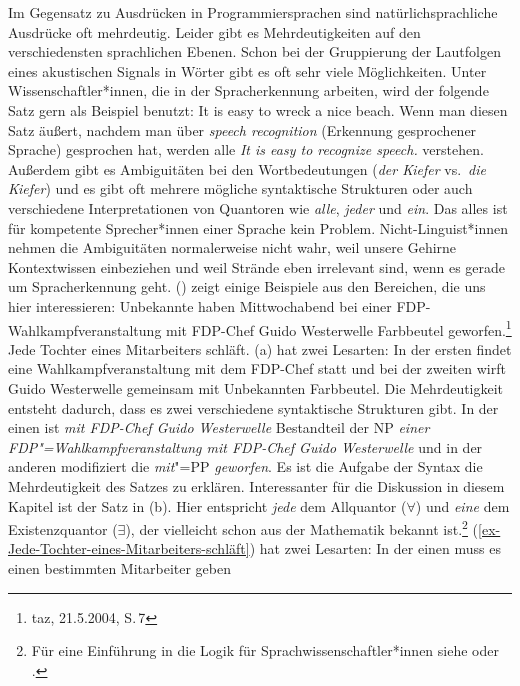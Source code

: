 Im Gegensatz zu Ausdrücken in Programmiersprachen sind natürlichsprachliche Ausdrücke oft
mehrdeutig. Leider gibt es Mehrdeutigkeiten auf den verschiedensten sprachlichen Ebenen. Schon bei der Gruppierung der
Lautfolgen eines akustischen Signals in Wörter gibt es oft sehr viele
Möglichkeiten. Unter Wissenschaftler*innen, die in der Spracherkennung arbeiten, wird der folgende
Satz gern als Beispiel benutzt:
\ea
It is easy to wreck a nice beach.
\z
Wenn man diesen Satz äußert, nachdem man über \emph{speech recognition} (Erkennung gesprochener Sprache)
gesprochen hat, werden alle \emph{It is easy to recognize speech.} verstehen. Außerdem gibt es
Ambiguitäten bei den Wortbedeutungen (\emph{der Kiefer} vs.\ \emph{die Kiefer}) und es gibt oft
mehrere mögliche syntaktische Strukturen oder auch verschiedene Interpretationen von Quantoren wie
\emph{alle}, \emph{jeder} und \emph{ein}. Das alles ist für kompetente Sprecher*innen einer Sprache
kein Problem. Nicht-Linguist*innen nehmen die Ambiguitäten normalerweise nicht wahr, weil unsere
Gehirne Kontextwissen einbeziehen und weil Strände eben irrelevant sind, wenn es gerade um
Spracherkennung geht. %
() zeigt einige Beispiele aus den Bereichen, die uns hier interessieren:
\eal
\ex Unbekannte haben Mittwochabend bei einer %
FDP-Wahlkampfveranstaltung mit FDP-Chef Guido Westerwelle Farbbeutel geworfen.\footnote{
taz, 21.5.2004, S.\,7
}
\ex
\label{ex-Jede-Tochter-eines-Mitarbeiters-schläft}
Jede Tochter eines Mitarbeiters schläft.
\zl 
(a) hat zwei Lesarten: In der ersten findet eine Wahlkampfveranstaltung mit dem FDP-Chef
statt und bei der zweiten wirft Guido Westerwelle gemeinsam mit Unbekannten Farbbeutel. Die
Mehrdeutigkeit entsteht dadurch, dass es zwei verschiedene syntaktische Strukturen gibt. In der einen ist
\emph{mit FDP-Chef Guido Westerwelle} Bestandteil der NP \emph{einer FDP"=Wahlkampfveranstaltung mit
  FDP-Chef Guido Westerwelle} und in der anderen modifiziert die \emph{mit}"=PP \emph{geworfen}.
Es ist die Aufgabe der Syntax die Mehrdeutigkeit des Satzes zu erklären. Interessanter für die
Diskussion in diesem Kapitel ist der Satz in (b). Hier entspricht \emph{jede} dem Allquantor ($\forall$) und \emph{eine} dem
Existenzquantor ($\exists$), der vielleicht schon aus der Mathematik bekannt ist.\footnote{%
Für eine Einführung in die Logik für Sprachwissenschaftler*innen siehe  oder .}
(\ref{ex-Jede-Tochter-eines-Mitarbeiters-schläft}) hat zwei Lesarten: In der einen muss es einen bestimmten Mitarbeiter geben
